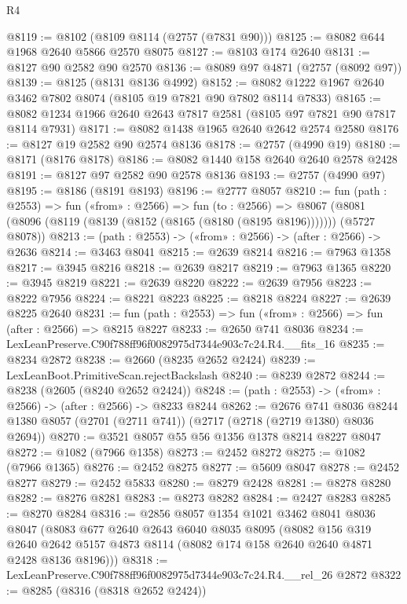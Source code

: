 \begin{lexlean}{R4}
\begin{coremodule}
@8119 := @8102 (@8109 @8114 (@2757 (@7831 @90)))
@8125 := @8082 @644 @1968 @2640 @5866 @2570 @8075
@8127 := @8103 @174 @2640
@8131 := @8127 @90 @2582 @90 @2570
@8136 := @8089 @97 @4871 (@2757 (@8092 @97))
@8139 := @8125 (@8131 @8136 @4992)
@8152 := @8082 @1222 @1967 @2640 @3462 @7802 @8074 (@8105 @19 @7821 @90 @7802 @8114 @7833)
@8165 := @8082 @1234 @1966 @2640 @2643 @7817 @2581 (@8105 @97 @7821 @90 @7817 @8114 @7931)
@8171 := @8082 @1438 @1965 @2640 @2642 @2574 @2580
@8176 := @8127 @19 @2582 @90 @2574 @8136
@8178 := @2757 (@4990 @19)
@8180 := @8171 (@8176 @8178)
@8186 := @8082 @1440 @158 @2640 @2640 @2578 @2428
@8191 := @8127 @97 @2582 @90 @2578 @8136
@8193 := @2757 (@4990 @97)
@8195 := @8186 (@8191 @8193)
@8196 := @2777 @8057
@8210 := fun (path : @2553) =>
  fun («from» : @2566) =>
  fun (to : @2566) =>
  @8067 (@8081 (@8096 (@8119 (@8139 (@8152 (@8165 (@8180 (@8195 @8196))))))) (@5727 @8078))
@8213 := (path : @2553) -> («from» : @2566) -> (after : @2566) -> @2636
@8214 := @3463 @8041
@8215 := @2639 @8214
@8216 := @7963 @1358
@8217 := @3945 @8216
@8218 := @2639 @8217
@8219 := @7963 @1365
@8220 := @3945 @8219
@8221 := @2639 @8220
@8222 := @2639 @7956
@8223 := @8222 @7956
@8224 := @8221 @8223
@8225 := @8218 @8224
@8227 := @2639 @8225 @2640
@8231 := fun (path : @2553) => fun («from» : @2566) => fun (after : @2566) => @8215 @8227
@8233 := @2650 @741 @8036
@8234 := LexLeanPreserve.C90f788ff96f0082975d7344e903c7c24.R4.__fits_16
@8235 := @8234 @2872
@8238 := @2660 (@8235 @2652 @2424)
@8239 := LexLeanBoot.PrimitiveScan.rejectBackslash
@8240 := @8239 @2872
@8244 := @8238 (@2605 (@8240 @2652 @2424))
@8248 := (path : @2553) -> («from» : @2566) -> (after : @2566) -> @8233 @8244
@8262 := @2676
    @741
    @8036
    @8244
    @1380
    @8057
    (@2701 (@2711 @741))
    (@2717 (@2718 (@2719 @1380) @8036 @2694))
@8270 := @3521 @8057 @55 @56 @1356 @1378 @8214 @8227 @8047
@8272 := @1082 (@7966 @1358)
@8273 := @2452 @8272
@8275 := @1082 (@7966 @1365)
@8276 := @2452 @8275
@8277 := @5609 @8047
@8278 := @2452 @8277
@8279 := @2452 @5833
@8280 := @8279 @2428
@8281 := @8278 @8280
@8282 := @8276 @8281
@8283 := @8273 @8282
@8284 := @2427 @8283
@8285 := @8270 @8284
@8316 := @2856
    @8057
    @1354
    @1021
    @3462
    @8041
    @8036
    @8047
    (@8083
      @677
      @2640
      @2643
      @6040
      @8035
      @8095
      (@8082
        @156
        @319
        @2640
        @2642
        @5157
        @4873
        @8114
        (@8082 @174 @158 @2640 @2640 @4871 @2428 @8136 @8196)))
@8318 := LexLeanPreserve.C90f788ff96f0082975d7344e903c7c24.R4.__rel_26 @2872
@8322 := @8285 (@8316 (@8318 @2652 @2424))

\end{coremodule}
\end{lexlean}
